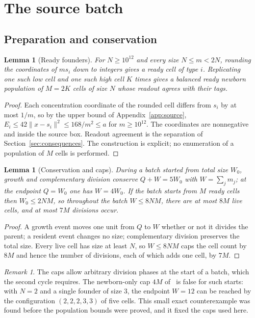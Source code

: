 \documentclass[11pt,a4paper]{article}
\theoremstyle{plain}
\newtheorem{lemma}[theorem]{Lemma}
\theoremstyle{definition}
\theoremstyle{remark}
\newtheorem{remark}[theorem]{Remark}
\begin{document}
\section{The source batch}\label{sec:batch}

\subsection{Preparation and conservation}
\begin{lemma}[Ready founders]\label{lem:founders}
For $N\ge10^{12}$ and every size $N\le m<2N$, rounding the coordinates of $ms_i$ down to integers gives a ready cell of type $i$. Replicating one such low cell and one such high cell $K$ times gives a balanced ready newborn population of $M=2K$ cells of size $N$ whose readout agrees with their tags.
\end{lemma}

\begin{proof}
Each concentration coordinate of the rounded cell differs from $s_i$ by at most $1/m$, so by the upper bound of Appendix~\ref{app:source}, $E_i\le42\|x-s_i\|^2\le168/m^2\le a$ for $m\ge10^{12}$. The coordinates are nonnegative and inside the source box. Readout agreement is the separation of Section~\ref{sec:consequences}. The construction is explicit; no enumeration of a population of $M$ cells is performed.
\end{proof}

\begin{lemma}[Conservation and caps]\label{lem:conservation}
During a batch started from total size $W_0$, growth and complementary division conserve $Q+W=5W_0$ with $W=\sum_jm_j$; at the endpoint $Q=W_0$ one has $W=4W_0$. If the batch starts from $M$ ready cells then $W_0\le2NM$, so throughout the batch $W\le8NM$, there are at most $8M$ live cells, and at most $7M$ divisions occur.
\end{lemma}

\begin{proof}
A growth event moves one unit from $Q$ to $W$ whether or not it divides the parent; a resident event changes no size; complementary division preserves the total size. Every live cell has size at least $N$, so $W\le8NM$ caps the cell count by $8M$ and hence the number of divisions, each of which adds one cell, by $7M$.
\end{proof}

\begin{remark}
The caps allow arbitrary division phases at the start of a batch, which the second cycle requires. The newborn-only cap $4M$ of~\citep{batch2026} is false for such starts: with $N=2$ and a single founder of size $3$, the endpoint $W=12$ can be reached by the configuration $(2,2,2,3,3)$ of five cells. This small exact counterexample was found before the population bounds were proved, and it fixed the caps used here.
\end{remark}
\end{document}

